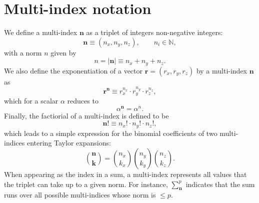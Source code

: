 \section{Multi-index notation}
\label{sec:multi_index_notation}

We define a multi-index $\mathbf{n}$ as a triplet of integers
non-negative integers:
\begin{equation}
  \mathbf{n} \equiv \left(n_x, n_y, n_z\right), \qquad n_i \in \mathbb{N},
\end{equation}
with a norm $n$ given by
\begin{equation}
  n = |\mathbf{n}| \equiv n_x + n_y + n_z. 
\end{equation}
We also define the exponentiation of a vector
$\mathbf{r}=(r_x,r_y,r_z)$ by a multi-index $\mathbf{n}$ as
\begin{equation}
  \mathbf{r}^\mathbf{n} \equiv r_x^{n_x} \cdot r_y^{n_y} \cdot r_z^{n_z},
\end{equation}
which for a scalar $\alpha$ reduces to
\begin{equation}
  \alpha^\mathbf{n} = \alpha^{n}.
\end{equation}
Finally, the factiorial of a multi-index is defined to be
\begin{equation}
  \mathbf{n}! \equiv n_x! \cdot n_y! \cdot n_z!,
\end{equation}
which leads to a simple expression for the binomial coefficients of
two multi-indices entering Taylor expansions:
\begin{equation}
  \binom{\mathbf{n}}{\mathbf{k}} = \binom{n_x}{k_x}\binom{n_y}{k_y}\binom{n_z}{k_z}.
\end{equation}
When appearing as the index in a sum, a multi-index represents all
values that the triplet can take up to a given norm. For instance,
$\sum_{\mathbf{n}}^{p}$ indicates that the sum runs over all possible
multi-indices whose norm is $\leq p$.
